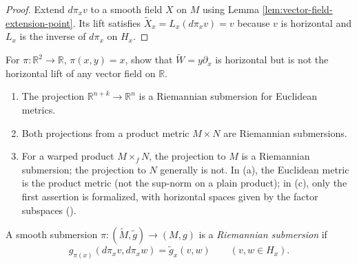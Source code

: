 \begin{proof}
\leanok
\sketch Extend $d\pi_xv$ to a smooth field $X$ on $M$ using Lemma \ref{lem:vector-field-extension-point}. Its lift satisfies $\tilde X_x=L_x(d\pi_xv)=v$ because $v$ is horizontal and $L_x$ is the inverse of $d\pi_x$ on $H_x$.
\end{proof}

\begin{exercise}
\label{exer:horizontal-vector-field-not-lift}
\leanok
{}
For $\pi:\mathbb R^2\to\mathbb R$, $\pi(x,y)=x$, show that $\tilde W=y\partial_x$ is horizontal but is not the horizontal lift of any vector field on $\mathbb R$.
\end{exercise}

\begin{example}
\label{ex:riemannian-submersions}
\leanok
{}
\begin{enumerate}
\item[(a)] The projection $\mathbb R^{n+k}\to\mathbb R^n$ is a Riemannian submersion for Euclidean metrics.
\item[(b)] Both projections from a product metric $M\times N$ are Riemannian submersions.
\item[(c)] For a warped product $M\times_fN$, the projection to $M$ is a Riemannian submersion; the projection to $N$ generally is not. In (a), the Euclidean metric is the product metric (not the sup-norm on a plain product); in (c), only the first assertion is formalized, with horizontal spaces given by the factor subspaces ().
\end{enumerate}
\end{example}

\begin{definition}
\label{def:riemannian-submersion}
\leanok
{}
A smooth submersion $\pi:(\tilde M,\tilde g)\to(M,g)$ is a \emph{Riemannian submersion} if
\[
g_{\pi(x)}(d\pi_xv,d\pi_xw)=\tilde g_x(v,w)\qquad(v,w\in H_x).
\]
\end{definition}

